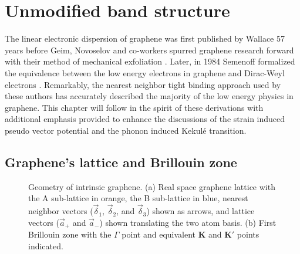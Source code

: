 \chapter{Unmodified band structure\label{chap:TB}}

The linear electronic dispersion of graphene was first published by Wallace \cite{Wallace1947} 57 years before Geim, Novoselov and co-workers spurred graphene research forward with their method of mechanical exfoliation \cite{Novoselov2004}.
Later, in 1984 Semenoff formalized the equivalence between the low energy electrons in graphene and Dirac-Weyl electrons \cite{Semenoff1984}.
Remarkably, the nearest neighbor tight binding approach used by these authors has accurately described the majority of the low energy physics in graphene.
This chapter will follow in the spirit of these derivations with additional emphasis provided to enhance the discussions of the strain induced pseudo vector potential and the phonon induced Kekul\'e transition.

\section{Graphene's lattice and Brillouin zone}
\begin{figure}
	\begin{center}
	
	\end{center}
	\caption[Geometry of intrinsic graphene.]{\label{fig:TB:geometry} Geometry of intrinsic graphene.  (a) Real space graphene lattice with the A sub-lattice in orange, the B sub-lattice in blue, nearest neighbor vectors ($\vec \delta_1$, $\vec \delta_2$, and $\vec \delta_3$) shown as arrows, and lattice vectors ($\vec a_+$ and $\vec a_-$) shown translating the two atom basis. (b) First Brillouin zone with the $\Gamma$ point and equivalent $\bm{K}$ and $\bm{K'}$ points indicated.}
\end{figure}

